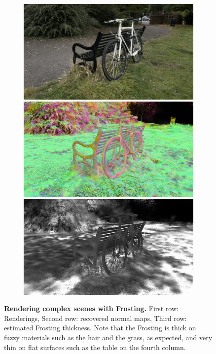 \begin{figure}[tb]
\begin{subfigure}{0.155\linewidth}
  \includegraphics[width=\linewidth]{images/renders/bicycle_rgb_52.jpg}
  \includegraphics[width=\linewidth]{images/normals/bicycle_normals_52bis.jpg}
  \includegraphics[width=\linewidth]{images/frosting_size/bicycle_size_52bis.jpg}
  \end{subfigure}
  \caption{
  \textbf{Rendering complex scenes with Frosting.} First row: Renderings, Second row: recovered normal maps, Third row: estimated Frosting thickness. Note that the Frosting is thick on fuzzy materials such as the hair and the grass, as expected, and very thin on flat surfaces such as the table on the fourth column.
  }
  \label{fig:frosting-renders}
\end{figure}